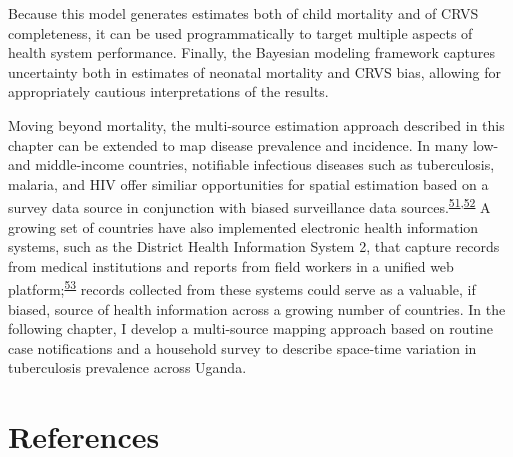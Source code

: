 \documentclass[
]{article}
\begin{document}
Because this model generates estimates both of child mortality and of CRVS completeness, it can be used programmatically to target multiple aspects of health system performance. Finally, the Bayesian modeling framework captures uncertainty both in estimates of neonatal mortality and CRVS bias, allowing for appropriately cautious interpretations of the results.

Moving beyond mortality, the multi-source estimation approach described in this chapter can be extended to map disease prevalence and incidence. In many low- and middle-income countries, notifiable infectious diseases such as tuberculosis, malaria, and HIV offer similiar opportunities for spatial estimation based on a survey data source in conjunction with biased surveillance data sources.\textsuperscript{\protect\hyperlink{ref-Rood2019}{51},\protect\hyperlink{ref-Dwyer-Lindgren2019}{52}} A growing set of countries have also implemented electronic health information systems, such as the District Health Information System 2, that capture records from medical institutions and reports from field workers in a unified web platform;\textsuperscript{\protect\hyperlink{ref-Dehnavieh2019}{53}} records collected from these systems could serve as a valuable, if biased, source of health information across a growing number of countries. In the following chapter, I develop a multi-source mapping approach based on routine case notifications and a household survey to describe space-time variation in tuberculosis prevalence across Uganda.

\hypertarget{references}{%
\section{References}\label{references}}
\end{document}
